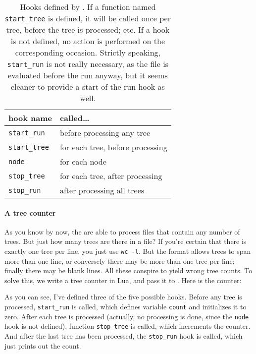 \begin{table}
	\centering
	\begin{tabular}{ll}
		hook name & called\ldots \\
		\hline
		\texttt{start\_run} 	& before processing any tree \\
		\texttt{start\_tree}	& for each tree, before processing \\
		\texttt{node}					& for each node \\
		\texttt{stop\_tree}		& for each tree, after processing \\
		\texttt{stop\_run}			& after processing all trees
	\end{tabular}
	\caption{%
		\label{tbl:luaedHooks}
		Hooks defined by \luaed. If a function named \texttt{start\_tree} is
		defined, it will be called once per tree, before the tree is processed; etc.
		If a hook is not defined, no action is performed on the corresponding
		occasion. Strictly speaking, \texttt{start\_run} is not really necessary, as
		the file is evaluated before the run anyway, but it seems cleaner to provide
		a start-of-the-run hook as well.
	}
\end{table}

\paragraph{A tree counter}

As you know by now, the \nutils{} are able to process files that contain any
number of trees. But just how many trees are there in a file? If you're certain
that there is exactly one tree per line, you just use \texttt{wc -l}. But the
\nw{} format allows trees to span more than one line, or conversely there may be
more than one tree per line; finally there may be blank lines. All these
conspire to yield wrong tree counts. To solve this, we write a tree counter in
Lua, and pass it to \luaed. Here is the counter:

\begin{samepage}


\end{samepage}

As you can see, I've defined three of the five possible hooks. Before any tree
is processed, \texttt{start\_run} is called, which defines variable
\texttt{count} and initializes it to zero. After each tree is processed
(actually, no processing is done, since the \texttt{node} hook is not defined),
function \texttt{stop\_tree} is called, which increments the counter. And after
the last tree has been processed, the \texttt{stop\_run} hook is called, which
just prints out the count.


